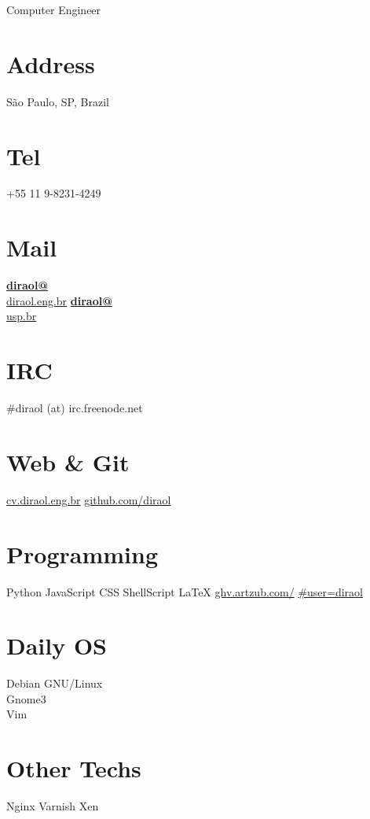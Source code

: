 \documentclass[]{friggeri-cv}
\begin{document}
      {Computer Engineer}
      

\begin{aside}
  \section{Address}
    São Paulo, SP, Brazil
    ~
  \section{Tel}
    +55 11 9-8231-4249
    ~
  \section{Mail}
    \href{mailto:diraol@diraol.eng.br}{\textbf{diraol@}\\diraol.eng.br}
    \href{mailto:diraol@usp.br}{\textbf{diraol@}\\usp.br}
    ~
  \section{IRC}
    \#diraol (at) irc.freenode.net
    ~
  \section{Web \& Git}
    \href{http://cv.diraol.eng.br}{cv.diraol.eng.br}
    \href{https://github.com/diraol}{github.com/diraol}
    ~
  \section{Programming}
    Python
    JavaScript
    CSS
    ShellScript
    \LaTeX
    \href{http://ghv.artzub.com/\#user=diraol}{ghv.artzub.com/}
    \href{http://ghv.artzub.com/\#user=diraol}{\#user=diraol}
    ~
  \section{Daily OS}
    Debian GNU/Linux\\%
    Gnome3\\%
    Vim
    ~
  \section{Other Techs}
    Nginx
    Varnish
    Xen  
\end{aside}
\end{document}

